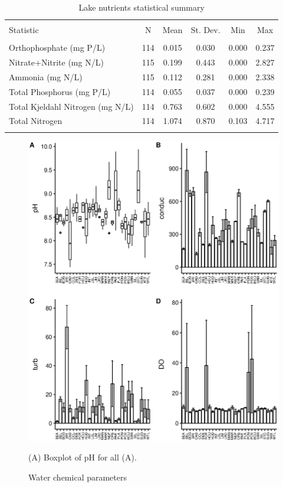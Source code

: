   \begin{table}[!ht]
    \centering
    \caption{Lake nutrients statistical summary}
    \label{}
  \begin{tabular}{@{\extracolsep{5pt}}lccccc}
  \\[-1.8ex]\hline
  \hline \\[-1.8ex]
  Statistic & \multicolumn{1}{c}{N} & \multicolumn{1}{c}{Mean} & \multicolumn{1}{c}{St. Dev.} & \multicolumn{1}{c}{Min} & \multicolumn{1}{c}{Max} \\
  \hline \\[-1.8ex]
   Orthophosphate (mg P/L) & 114 & 0.015 & 0.030 & 0.000 & 0.237 \\
  Nitrate+Nitrite (mg N/L) & 115 & 0.199 & 0.443 & 0.000 & 2.827 \\
  Ammonia (mg N/L)  & 115 & 0.112 & 0.281 & 0.000 & 2.338 \\
  Total Phosphorus (mg P/L) & 114 & 0.055 & 0.037 & 0.000 & 0.239 \\
  Total Kjeldahl Nitrogen (mg N/L) & 114 & 0.763 & 0.602 & 0.000 & 4.555 \\
  Total Nitrogen & 114 & 1.074 & 0.870 & 0.103 & 4.717 \\
  \hline \\[-1.8ex]
  \end{tabular}
  \end{table}





\begin{figure}[!ht]
  \includegraphics{figures/watboxplotlake.eps}
  \caption{Water chemical parameters}
  (A) Boxplot of pH for all (A).
\end{figure}



